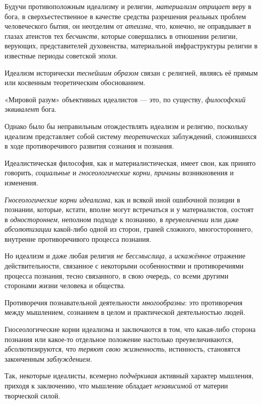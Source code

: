 \documentclass[a4paper,14pt,russian]{extreport}
\begin{document}
Будучи противоположным идеализму и религии, \emph{материализм отрицает} веру в бога, в сверхъестественное в качестве средства разрешения реальных проблем человеческого бытия, он неотделим от \emph{атеизма}, что, конечно, не оправдывает в глазах атеистов тех \emph{бесчинств}, которые совершались в отношении религии, верующих, представителей духовенства, материальной инфраструктуры религии в известные периоды советской эпохи.

Идеализм исторически \emph{теснейшим образом} связан с религией, являясь её прямым или косвенным теоретическим обоснованием.

«Мировой разум» объективных идеалистов --- это, по существу, \emph{философский эквивалент} бога.

Однако было бы неправильным отождествлять идеализм и религию, поскольку идеализм представляет собой систему \emph{теоретических} заблуждений, сложившихся в ходе противоречивого развития сознания и познания.

Идеалистическая философия, как и материалистическая, имеет свои, как принято говорить, \emph{социальные} и \emph{гносеологические корни}, \emph{причины} возникновения и изменения.

\emph{Гносеологические корни идеализма}, как и всякой иной ошибочной позиции в познании, которые, кстати, вполне могут встречаться и у материалистов, состоят в \emph{одностороннем}, неполном подходе к познанию, в \emph{преувеличении} или даже \emph{абсолютизации} какой-либо одной из сторон, граней сложного, многостороннего, внутренне противоречивого процесса познания.

Но идеализм и даже любая религия \emph{не бессмыслица}, а \emph{искажённое} отражение действительности, связанное с некоторыми особенностями и противоречиями процесса познания, тесно связанного, в свою очередь, со всеми другими сторонами жизни человека и общества.

Противоречия познавательной деятельности \emph{многообразны}: это противоречия между мышлением, сознанием в целом и практической деятельностью людей.

Гносеологические корни идеализма и заключаются в том, что какая-либо сторона познания или какое-то отдельное положение настолько преувеличиваются, абсолютизируются, что \emph{теряют свою жизненность}, истинность, становятся законченным \emph{заблуждением}.

Так, некоторые идеалисты, всемерно \emph{подчёркивая} активный характер мышления, приходя к заключению, что мышление обладает \emph{независимой} от материи творческой силой.
\end{document}
